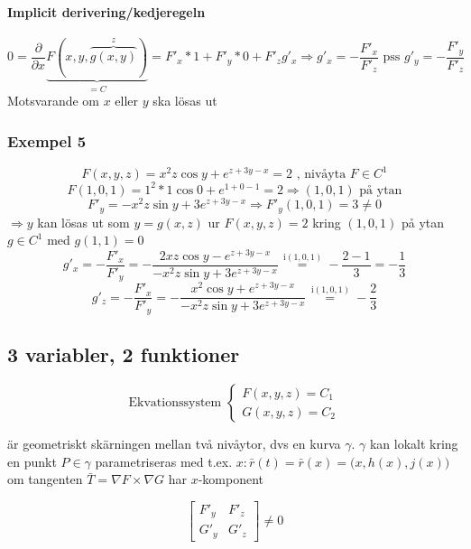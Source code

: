 \documentclass[a4paper]{article}
\begin{document}
\paragraph{Implicit derivering/kedjeregeln}

\[
	0 = \frac{\partial}{\partial x} \underbrace{F(x,y,\overbrace{g(x,y)}^z)}_{=C} = F'_x * 1 + F'_y * 0 + F'_zg'_x \Rightarrow g'_x = - \frac{F'_x}{F'_z} \text{ pss } g'_y = - \frac{F'_y}{F'_z}
\]
Motsvarande om \(x\) eller \(y\) ska lösas ut

\subsubsection{Exempel 5}
\begin{equation} \label{eq:8.7}
	F(x,y,z) = x^2z\cos{y} + e^{z + 3y - x} = 2 \text{ , nivåyta } F \in C^1
\end{equation}
\[
	F(1,0,1) = 1^2 * 1\cos{0} + e ^{1+0-1} = 2 \Rightarrow (1,0,1) \text{ på ytan}
\]
\[
	F'_y = - x^2z\sin{y} + 3e^{z+3y-x} \Rightarrow F'_y(1,0,1) = 3 \neq 0
\]
\(\Rightarrow y\) kan lösas ut som \(y = g(x,z)\) ur \(F(x,y,z) = 2\) kring \((1,0,1)\) på ytan \(g \in C^1\) med \(g(1,1) = 0\)
\[
	g'_x = - \frac{F'_x}{F'_y} = - \frac{2xz\cos{y} - e^{z+3y-x}}{- x^2z\sin{y} + 3e^{z+3y-x}} \overset{\,\mathrm{i (1,0,1)}}{=} - \frac{2-1}{3} = - \frac{1}{3}
\]
\[
	g'_z = - \frac{F'_x}{F'_y} = - \frac{x^2\cos{y} + e^{z+3y-x}}{- x^2z\sin{y} + 3e^{z+3y-x}} \overset{\,\mathrm{i (1,0,1)}}{=} - \frac{2}{3}
\]

\subsection{3 variabler, 2 funktioner}

\[
\text{Ekvationssystem }
\left\{\begin{array}{rcl}
	F(x,y,z) = C_1 \\
	G(x,y,z) = C_2
\end{array}\right.
\]

är geometriskt skärningen mellan två nivåytor, dvs en kurva \(\gamma\). \newline
\(\gamma\) kan lokalt kring en punkt \(P \in \gamma\) parametriseras med t.ex. \(x: \bar{r}(t) = \bar{r}(x) = \Big(x,h(x),j(x)\Big)\) om tangenten \newline
\(\bar{T} = \nabla F \times \nabla G\) har \(x\)-komponent

\[\begin{bmatrix}
	F'_y & F'_z \\
	G'_y & G'_z
\end{bmatrix}\neq 0\]
\end{document}
